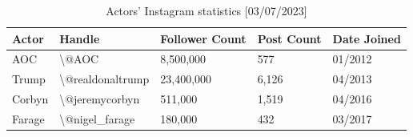 \documentclass[a4paper, nobind]{templates/ociamthesis}
\begin{document}
\begin{table}

\caption{\label{tab:unnamed-chunk-2}Actors’ Instagram statistics [03/07/2023]}
\centering
\begin{tabular}[t]{l|l|l|l|l}
\hline
Actor & Handle & Follower Count & Post Count & Date Joined\\
\hline
AOC & \textbackslash{}@AOC & 8,500,000 & 577 & 01/2012\\
\hline
Trump & \textbackslash{}@realdonaltrump & 23,400,000 & 6,126 & 04/2013\\
\hline
Corbyn & \textbackslash{}@jeremycorbyn & 511,000 & 1,519 & 04/2016\\
\hline
Farage & \textbackslash{}@nigel\_farage & 180,000 & 432 & 03/2017\\
\hline
\end{tabular}
\end{table}
\end{document}
